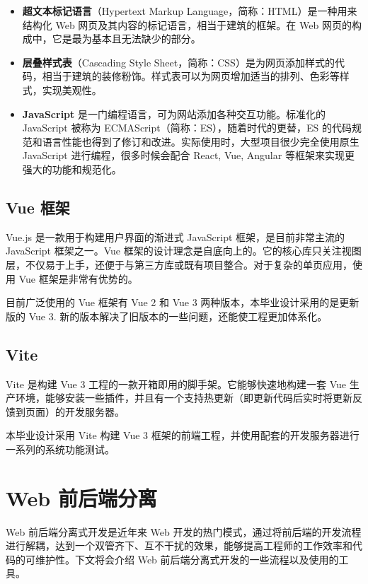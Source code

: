 \documentclass[a4paper,AutoFakeBold,oneside,12pt]{book}
\begin{document}
\begin{itemize}
\item \textbf{超文本标记语言}（Hypertext Markup Language，简称：HTML）是一种用来结构化 Web 网页及其内容的标记语言，相当于建筑的框架。在 Web 网页的构成中，它是最为基本且无法缺少的部分。\cite{html_mdn}

\item \textbf{层叠样式表}（Cascading Style Sheet，简称：CSS）是为网页添加样式的代码，相当于建筑的装修粉饰。样式表可以为网页增加适当的排列、色彩等样式，实现美观性。\cite{css_mdn}

\item \textbf{JavaScript} 是一门编程语言，可为网站添加各种交互功能。标准化的 JavaScript 被称为 ECMAScript（简称：ES），随着时代的更替，ES 的代码规范和语言性能也得到了修订和改进。\cite{javascript_mdn}实际使用时，大型项目很少完全使用原生 JavaScript 进行编程，很多时候会配合 React, Vue, Angular 等框架来实现更强大的功能和规范化。
\end{itemize}

\subsection{Vue 框架}
Vue.js 是一款用于构建用户界面的渐进式 JavaScript 框架，是目前非常主流的 JavaScript 框架之一。Vue 框架的设计理念是自底向上的。它的核心库只关注视图层，不仅易于上手，还便于与第三方库或既有项目整合。对于复杂的单页应用，使用 Vue 框架是非常有优势的。\cite{vuejs}

目前广泛使用的 Vue 框架有 Vue 2 和 Vue 3 两种版本，本毕业设计采用的是更新版的 Vue 3. 新的版本解决了旧版本的一些问题，还能使工程更加体系化。

\subsection{Vite}
Vite 是构建 Vue 3 工程的一款开箱即用的脚手架。它能够快速地构建一套 Vue 生产环境，能够安装一些插件，并且有一个支持热更新（即更新代码后实时将更新反馈到页面）的开发服务器。\cite{Vite}

本毕业设计采用 Vite 构建 Vue 3 框架的前端工程，并使用配套的开发服务器进行一系列的系统功能测试。

\section{Web 前后端分离}
Web 前后端分离式开发是近年来 Web 开发的热门模式，通过将前后端的开发流程进行解耦，达到一个双管齐下、互不干扰的效果，能够提高工程师的工作效率和代码的可维护性。下文将会介绍 Web 前后端分离式开发的一些流程以及使用的工具。
\end{document}
